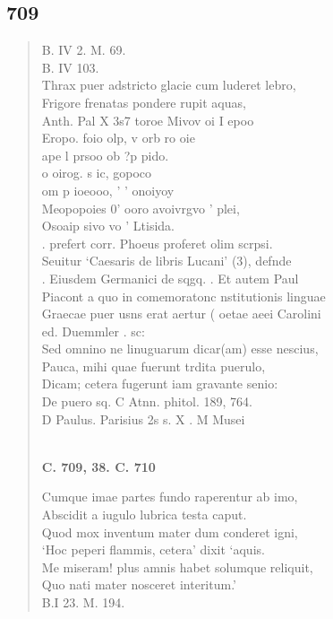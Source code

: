 \documentclass[11pt, a4paper]{report}
\begin{document}
            \subsection*{709}
      \begin{verse}
      B. IV 2. M. 69. \\ B. IV 103. \\ Thrax puer adstricto glacie cum luderet lebro, \\ Frigore frenatas pondere rupit aquas, \\ Anth. Pal X 3s7 toroe Mivov oi I epoo \\ Eropo. foio olp, v orb ro oie \\ ape l prsoo ob ?p pido. \\ o oirog. s ic, gopoco \\ om p ioeooo, ’ ’ onoiyoy \\ Meopopoies 0’ ooro avoivrgvo ’ plei, \\ Osoaip sivo vo ’ Ltisida. \\ . prefert corr. Phoeus proferet olim scrpsi. \\ Seuitur ‘Caesaris de libris Lucani’ (3), defnde \\ . Eiusdem Germanici de sqgq. . Et autem Paul \\ Piacont a quo in comemoratonc nstitutionis linguae \\ Graecae puer usns erat aertur ( oetae aeei Carolini \\ ed. Duemmler . sc: \\ Sed omnino ne linuguarum dicar(am) esse nescius, \\ Pauca, mihi quae fuerunt trdita puerulo, \\ Dicam; cetera fugerunt iam gravante senio: \\ De puero sq. C Atnn. phitol. 189, 764. \\ D Paulus. Parisius 2s s. X . M Musei \\ 
        ﻿\pagebreak 
    \begin{center} \textbf{C. 709, 38. C. 710} \end{center} \marginpar{[175]} Cumque imae partes fundo raperentur ab imo, \\ Abscidit a iugulo lubrica testa caput. \\ Quod mox inventum mater dum conderet igni, \\ ‘Hoc peperi flammis, cetera’ dixit ‘aquis. \\ Me miseram! plus amnis habet solumque reliquit, \\ Quo nati mater nosceret interitum.’ \\ B.I 23. M. 194. \\ 
      \end{verse}
  
\end{document}
